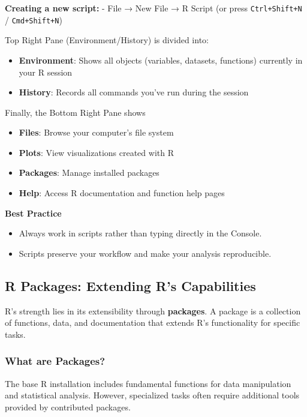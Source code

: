 \documentclass[
  10pt,
  b5paper,
  oneside]{book}
\begin{document}
\textbf{Creating a new script:}
- File → New File → R Script (or press \texttt{Ctrl+Shift+N} / \texttt{Cmd+Shift+N})

Top Right Pane (Environment/History) is divided into:

\begin{itemize}
\item
  \textbf{Environment}: Shows all objects (variables, datasets, functions) currently in your R session
\item
  \textbf{History}: Records all commands you've run during the session
\end{itemize}

Finally, the Bottom Right Pane shows

\begin{itemize}
\item
  \textbf{Files}: Browse your computer's file system
\item
  \textbf{Plots}: View visualizations created with R
\item
  \textbf{Packages}: Manage installed packages
\item
  \textbf{Help}: Access R documentation and function help pages
\end{itemize}

\textbf{Best Practice}

\begin{itemize}
\item
  Always work in scripts rather than typing directly in the Console.
\item
  Scripts preserve your workflow and make your analysis reproducible.
\end{itemize}

\subsection{R Packages: Extending R's Capabilities}\label{r-packages-extending-rs-capabilities}

R's strength lies in its extensibility through \textbf{packages}.
A package is a collection of functions, data, and documentation that extends R's functionality for specific tasks.

\subsubsection{What are Packages?}\label{what-are-packages}

The base R installation includes fundamental functions for data manipulation and statistical analysis.
However, specialized tasks often require additional tools provided by contributed packages.
\end{document}
